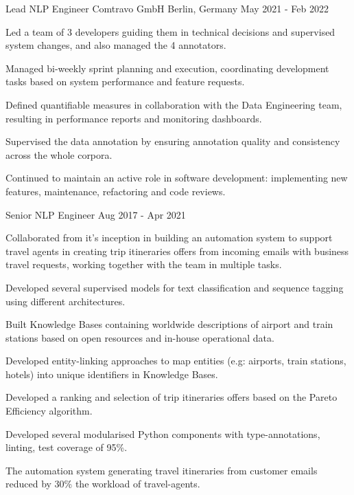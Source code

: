\begin{cventries}

\cventry
    {Lead NLP Engineer} 
    {Comtravo GmbH} 
    {Berlin, Germany} 
    {May 2021 - Feb 2022}
    {
      \begin{cvitems} 
		  \item {Led a team of 3 developers guiding them in technical decisions and supervised system changes, and also managed the 4 annotators.}
		  \item {Managed bi-weekly sprint planning and execution, coordinating development tasks based on system performance and feature requests.}
		  \item {Defined quantifiable measures in collaboration with the Data Engineering team, resulting in performance reports and monitoring dashboards.}
		  \item {Supervised the data annotation by ensuring annotation quality and consistency across the whole corpora.}
		  \item {Continued to maintain an active role in software development: implementing new features, maintenance, refactoring and code reviews.}
        \end{cvitems}
 	}


  \cventry
    {Senior NLP Engineer}
    {} %
    {} %
    {Aug 2017 - Apr 2021} %
    {
      \begin{cvitems}
		\item {Collaborated from it's inception in building an automation system to support travel agents in creating trip itineraries offers from incoming emails with business travel requests, working together with the team in multiple tasks.}
		\item {Developed several supervised models for text classification and sequence tagging using different architectures.}
		\item {Built Knowledge Bases containing worldwide descriptions of airport and train stations based on open resources and in-house operational data.}
		\item {Developed entity-linking approaches to map entities (e.g: airports, train stations, hotels) into unique identifiers in Knowledge Bases.}
		\item {Developed a ranking and selection of trip itineraries offers based on the Pareto Efficiency algorithm.}
		\item {Developed several modularised Python components with type-annotations, linting, test coverage of 95\%.}
		\item {The automation system generating travel itineraries from customer emails reduced by 30\% the workload of travel-agents.}
        \end{cvitems}
 	}


\end{cventries}

